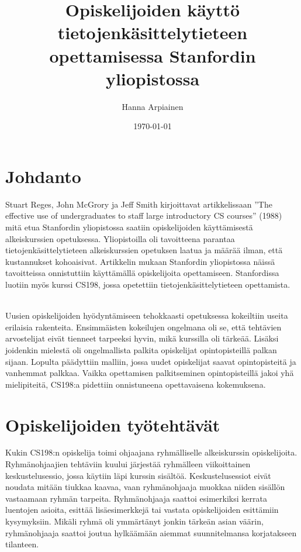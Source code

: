 \documentclass[finnish]{tktltiki2}
\title{﻿Opiskelijoiden käyttö tietojenkäsittelytieteen opettamisessa Stanfordin yliopistossa}
\author{Hanna Arpiainen}
\date{\today}
\theoremstyle{definition}
\theoremstyle{remark}
\begin{document}
\maketitle
\makeabstract

\tableofcontents
\newpage



\section{Johdanto}

Stuart Reges, John McGrory ja Jeff Smith kirjoittavat artikkelissaan ”The effective use of undergraduates to staff large introductory CS courses” (1988) mitä etua Stanfordin yliopistossa saatiin opiskelijoiden käyttämisestä alkeiskurssien opetuksessa. Yliopistoilla oli tavoitteena parantaa tietojenkäsittelytieteen alkeiskurssien opetuksen laatua ja määrää ilman, että kustannukset kohoaisivat. Artikkelin mukaan Stanfordin yliopistossa näissä tavoitteissa onnistuttiin käyttämällä opiskelijoita opettamiseen. Stanfordissa luotiin myös kurssi CS198, jossa opetettiin tietojenkäsittelytieteen opettamista.

\\

Uusien opiskelijoiden hyödyntämiseen tehokkaasti opetuksessa kokeiltiin useita erilaisia rakenteita. Ensimmäisten kokeilujen ongelmana oli se, että tehtävien arvostelijat eivät tienneet tarpeeksi hyvin, mikä kurssilla oli tärkeää. Lisäksi joidenkin mielestä oli ongelmallista palkita opiskelijat opintopisteillä palkan sijaan. Lopulta päädyttiin malliin, jossa uudet opiskelijat saavat opintopisteitä ja vanhemmat palkkaa. Vaikka opettamisen palkitseminen opintopisteillä jakoi yhä mielipiteitä, CS198:a pidettiin onnistuneena opettavaisena kokemuksena.





\section{Opiskelijoiden työtehtävät}

Kukin CS198:n opiskelija toimi ohjaajana ryhmälliselle alkeiskurssin opiskelijoita. Ryhmänohjaajien tehtäviin kuului järjestää ryhmälleen viikoittainen keskustelusessio, jossa käytiin läpi kurssin sisältöä. Keskustelusessiot eivät noudata mitään tiukkaa kaavaa, vaan ryhmänohjaaja muokkaa niiden sisällön vastaamaan ryhmän tarpeita. Ryhmänohjaaja saattoi esimerkiksi kerrata luentojen asioita, esittää lisäesimerkkejä tai vastata opiskelijoiden esittämiin kysymyksiin. Mikäli ryhmä oli ymmärtänyt jonkin tärkeän asian väärin, ryhmänohjaaja saattoi joutua hylkäämään aiemmat suunnitelmansa korjatakseen tilanteen.
\end{document}

